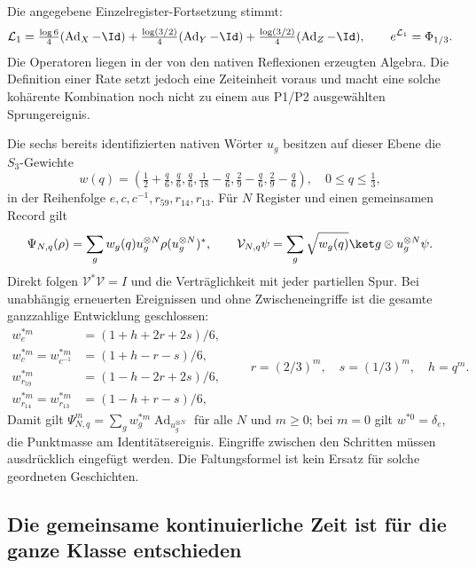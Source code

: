 Die angegebene Einzelregister-Fortsetzung stimmt:
\begin{equation}
\mathcal L_1=\tfrac{\log6}{4}(\operatorname{Ad}_X-\Id)
+\tfrac{\log(3/2)}4(\operatorname{Ad}_Y-\Id)
+\tfrac{\log(3/2)}4(\operatorname{Ad}_Z-\Id),\qquad
 e^{\mathcal L_1}=\Phi_{1/3}.
\end{equation}
Die Operatoren liegen in der von den nativen Reflexionen erzeugten Algebra. Die Definition einer Rate setzt jedoch eine Zeiteinheit voraus und macht eine solche kohärente Kombination noch nicht zu einem aus P1/P2 ausgewählten Sprungereignis.

Die sechs bereits identifizierten nativen Wörter $u_g$ besitzen auf dieser Ebene die $S_3$-Gewichte
\begin{equation}\label{eq:sharedweights}
w(q)=\left(\tfrac12+\tfrac q6,\tfrac q6,\tfrac q6,
\tfrac1{18}-\tfrac q6,\tfrac29-\tfrac q6,\tfrac29-\tfrac q6\right),
\quad 0\le q\le\tfrac13,
\end{equation}
in der Reihenfolge $e,c,c^{-1},r_{59},r_{14},r_{13}$.
Für $N$ Register und einen gemeinsamen Record gilt
\begin{equation}\label{eq:sharedhierarchy}
\Psi_{N,q}(\rho)=\sum_gw_g(q)u_g^{\otimes N}\rho(u_g^{\otimes N})^*,
\qquad
\mathcal V_{N,q}\psi=\sum_g\sqrt{w_g(q)}\ket g\otimes u_g^{\otimes N}\psi.
\end{equation}
Direkt folgen $\mathcal V^*\mathcal V=I$ und die Verträglichkeit mit jeder partiellen Spur. Bei unabhängig erneuerten Ereignissen und ohne Zwischeneingriffe ist die gesamte ganzzahlige Entwicklung geschlossen:
\begin{equation}
\begin{split}
w_e^{*m}&=(1+h+2r+2s)/6,\\
w_c^{*m}=w_{c^{-1}}^{*m}&=(1+h-r-s)/6,\\
w_{r_{59}}^{*m}&=(1-h-2r+2s)/6,\\
w_{r_{14}}^{*m}=w_{r_{13}}^{*m}&=(1-h+r-s)/6,
\end{split}\qquad
r=(2/3)^m,\quad s=(1/3)^m,\quad h=q^m.
\end{equation}
Damit gilt $\Psi_{N,q}^m=\sum_gw_g^{*m}\operatorname{Ad}_{u_g^{\otimes N}}$ für alle $N$ und $m\ge0$; bei $m=0$ gilt $w^{*0}=\delta_e$, die Punktmasse am Identitätsereignis. Eingriffe zwischen den Schritten müssen ausdrücklich eingefügt werden. Die Faltungsformel ist kein Ersatz für solche geordneten Geschichten.

\subsection{Die gemeinsame kontinuierliche Zeit ist für die ganze Klasse entschieden}

